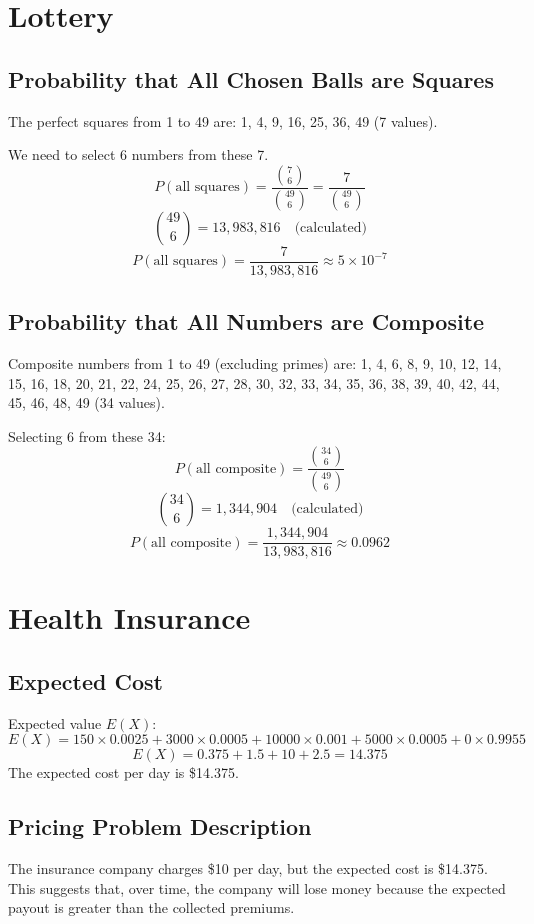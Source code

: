 \documentclass{article}
\begin{document}
\newpage

\section{Lottery}

\subsection{Probability that All Chosen Balls are Squares}
The perfect squares from 1 to 49 are: 1, 4, 9, 16, 25, 36, 49 (7 values).

We need to select 6 numbers from these 7.
\[
P(\text{all squares}) = \frac{\binom{7}{6}}{\binom{49}{6}} = \frac{7}{\binom{49}{6}}
\]
\[
\binom{49}{6} = 13,983,816 \quad \text{(calculated)}
\]
\[
P(\text{all squares}) = \frac{7}{13,983,816} \approx 5 \times 10^{-7}
\]

\subsection{Probability that All Numbers are Composite}
Composite numbers from 1 to 49 (excluding primes) are: 1, 4, 6, 8, 9, 10, 12, 14, 15, 16, 18, 20, 21, 22, 24, 25, 26, 27, 28, 30, 32, 33, 34, 35, 36, 38, 39, 40, 42, 44, 45, 46, 48, 49 (34 values).

Selecting 6 from these 34:
\[
P(\text{all composite}) = \frac{\binom{34}{6}}{\binom{49}{6}}
\]
\[
\binom{34}{6} = 1,344,904 \quad \text{(calculated)}
\]
\[
P(\text{all composite}) = \frac{1,344,904}{13,983,816} \approx 0.0962
\]

\newpage

\section{Health Insurance}

\subsection{Expected Cost}
Expected value \( E(X) \):
\[
E(X) = 150 \times 0.0025 + 3000 \times 0.0005 + 10000 \times 0.001 + 5000 \times 0.0005 + 0 \times 0.9955
\]
\[
E(X) = 0.375 + 1.5 + 10 + 2.5 = 14.375
\]
The expected cost per day is \$14.375.

\subsection{Pricing Problem Description}
The insurance company charges \$10 per day, but the expected cost is \$14.375. This suggests that, over time, the company will lose money because the expected payout is greater than the collected premiums.
\end{document}
